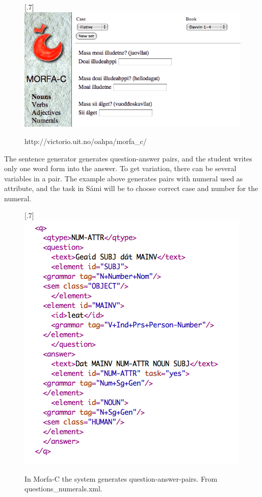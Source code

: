 \documentclass[a4paper,12pt]{article}
\begin{document}
\begin{figure}[htbp]
\begin{center}
\scalebox{.7}[.7]{\includegraphics{img/morfaC.png}}\\
\caption{http://victorio.uit.no/oahpa/morfa\_c/}
\label{morfac}
\end{center}
\end{figure}

\vspace{0.5cm}

The sentence generator generates question-answer pairs, and the student writes only one word form into the answer. To get variation, there can be several variables in a pair. The example above generates pairs with numeral used as attribute, and the task in Sámi will be to choose correct case and number for the numeral.\\  


\begin{figure}[htbp]
\begin{center}
\scalebox{.7}[.7]{\includegraphics{img/morfa_question.png}}\\
\caption{In Morfa-C the system generates question-answer-pairs. From questions\_numerals.xml.}
\label{questionm}
\end{center}
\end{figure}
\end{document}
